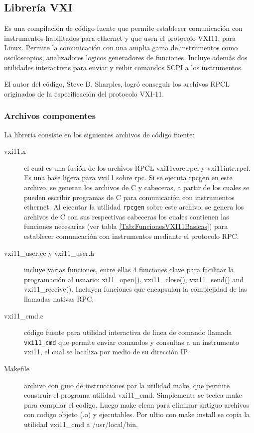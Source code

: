 \documentclass[paper=letter,oneside,fontsize=11pt, parskip=full]{scrartcl}
\begin{document}
		\subsection{Librería VXI}
		Es una compilación de código fuente que permite establecer comunicación con instrumentos habilitados para ethernet y que usen el protocolo VXI11, para Linux. Permite la comunicación con una amplia gama de instrumentos como osciloscopios, analizadores logicos generadores de funciones. Incluye además dos utilidades interactivas para enviar y reibir comandos SCPI a los instrumentos.
		
		El autor del código, Steve D. Sharples, logró conseguir los archivos RPCL originados de la especificación del protocolo VXI-11. 
		
		\subsubsection{Archivos componentes}
		La librería consiste en los siguientes archivos de código fuente:
		
		\begin{description}
			\item[\ttfamily vxi11.x] el cual es una fusión de los archivos RPCL vxi11core.rpcl y vxi11intr.rpcl. Es una base ligera para vxi11 sobre rpc. Si se ejecuta rpcgen en este archivo, se generan los archivos de C y cabeceras, a partir de los cuales se pueden escribir programas de C para comunicación con instrumentos ethernet. Al ejecutar la utilidad \texttt{rpcgen} sobre este archivo, se genera los archivos de C con sus respectivas cabeceras los cuales contienen las funciones necesarias (ver tabla \ref{Tab:FuncionesVXI11Basicas}) para establecer comunicación con instrumentos mediante el protocolo RPC.
			
			\item[\ttfamily vxi11\_user.cc y vxi11\_user.h]  incluye varias funciones, entre ellas 4 funciones clave para facilitar la programación al usuario: xi11\_open(), vxi11\_close(), vxi11\_send() and vxi11\_receive(). Incluyen funciones que encapsulan la complejidad de las llamadas nativas RPC.
			
			\item[\ttfamily vxi11\_cmd.c] código fuente para utilidad interactiva de linea de comando llamada \texttt{vxi11\_cmd} que permite enviar comandos y consultas a un instrumento vxi11, el cual se localiza por medio de su dirección IP.
			
			\item[\ttfamily Makefile] archivo con guio de instrucciones par la utilidad make, que permite construir el programa utilidad vxi11\_cmd. Simplemente se teclea make para compilar el codigo. Luego make clean para eliminar antiguo archivos con codigo objeto (.o) y ejecutables. Por ultio con make install se copia la utilidad vxi11\_cmd a /usr/local/bin.		
		\end{description}		
	
\end{document}
